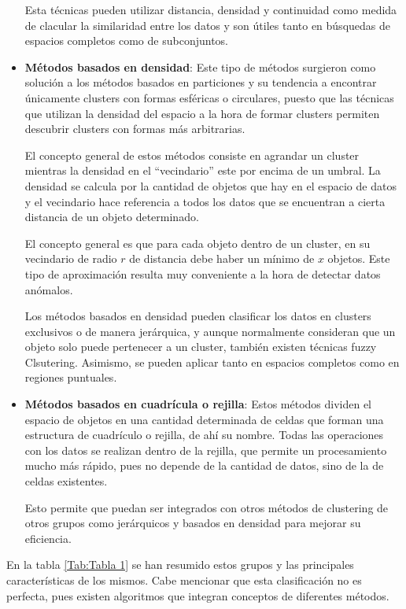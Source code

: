 \documentclass[3p,twocolumn]{elsarticle}
\begin{document}
\begin{itemize}
  Esta técnicas pueden utilizar distancia, densidad y continuidad como medida de clacular la similaridad entre los datos y son útiles tanto en búsquedas de espacios completos como de subconjuntos.
  
  \item \textbf{Métodos basados en densidad}: Este tipo de métodos surgieron como solución a los métodos basados en particiones y su tendencia a encontrar únicamente clusters con formas esféricas o circulares, puesto que las técnicas que utilizan la densidad del espacio a la hora de formar clusters permiten descubrir clusters con formas más arbitrarias. 
  
  El concepto general de estos métodos consiste en agrandar un cluster mientras la densidad en el ``vecindario'' este por encima de un umbral. La densidad se calcula por la cantidad de objetos que hay en el espacio de datos y el vecindario hace referencia a todos los datos que se encuentran a cierta distancia de un objeto determinado.
  
  El concepto general es que para cada objeto dentro de un cluster, en su vecindario de radio $r$ de distancia debe haber un mínimo de $x$ objetos. Este tipo de aproximación resulta muy conveniente a la hora de detectar datos anómalos.
  
  Los métodos basados en densidad pueden clasificar los datos en clusters exclusivos o de manera jerárquica, y aunque normalmente consideran que un objeto solo puede pertenecer a un cluster, también existen técnicas fuzzy Clsutering. Asimismo, se pueden aplicar tanto en espacios completos como en regiones puntuales.
  
  \item \textbf{Métodos basados en cuadrícula o rejilla}: Estos métodos dividen el espacio de objetos en una cantidad determinada de celdas que forman una estructura de cuadrículo o rejilla, de ahí su nombre. Todas las operaciones con los datos se realizan dentro de la rejilla, que permite un procesamiento mucho más rápido, pues no depende de la cantidad de datos, sino de la de celdas existentes.
  
  Esto permite que puedan ser integrados con otros métodos de clustering de otros grupos como jerárquicos y basados en densidad para mejorar su eficiencia.
\end{itemize}

En la tabla \ref{Tab:Tabla 1} se han resumido estos grupos y las principales características de los mismos. Cabe mencionar que esta clasificación no es perfecta, pues existen algoritmos que integran conceptos de diferentes métodos. 
\end{document}
